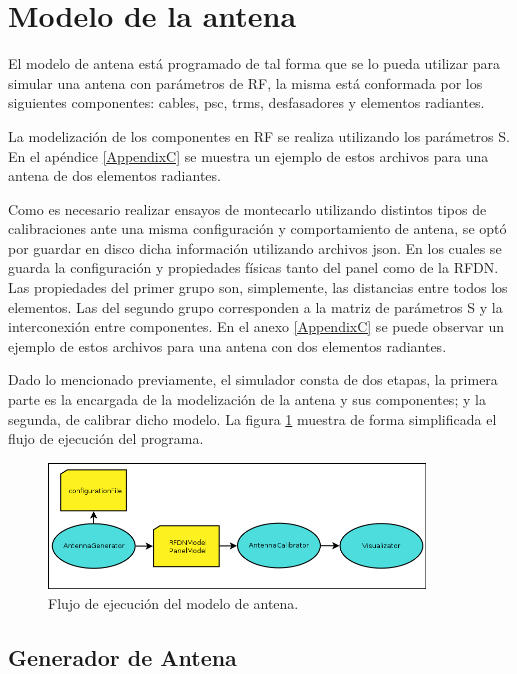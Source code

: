 \section{Modelo de la antena}

El modelo de antena está programado de tal forma que se lo pueda utilizar para simular una antena con parámetros de RF,
la misma está conformada por los siguientes componentes: cables, psc, trms, desfasadores y elementos radiantes. 

La modelizaci\'on de los componentes en RF se realiza utilizando los par\'ametros S. En el apéndice \ref{AppendixC} se muestra 
un ejemplo de estos archivos para una antena de dos elementos radiantes.

Como es necesario realizar ensayos de montecarlo utilizando distintos tipos de calibraciones ante una misma configuración y 
comportamiento de antena, se optó por guardar en disco dicha información utilizando archivos json. En los cuales se guarda la
configuración y propiedades físicas tanto del panel como de la RFDN. Las propiedades del primer grupo son, simplemente, las 
distancias entre todos los elementos. Las del segundo grupo corresponden a la matriz de parámetros S y la interconexión entre 
componentes. En el anexo \ref{AppendixC} se puede observar un ejemplo de estos archivos para una antena con dos elementos 
radiantes.

Dado lo mencionado previamente, el simulador consta de dos etapas, la primera parte es la encargada de la modelización
de la antena y sus componentes; y la segunda, de calibrar dicho modelo. La figura \ref{fig:prog_inic} muestra de forma 
simplificada el flujo de ejecuci\'on del programa.

\begin{figure}
 \centering
 \includegraphics[width=10cm]{gfx/FlujoEjecucion.png}
 \caption{Flujo de ejecuci\'on del modelo de antena.}
 \label{fig:prog_inic}
\end{figure}


\subsection{Generador de Antena}

